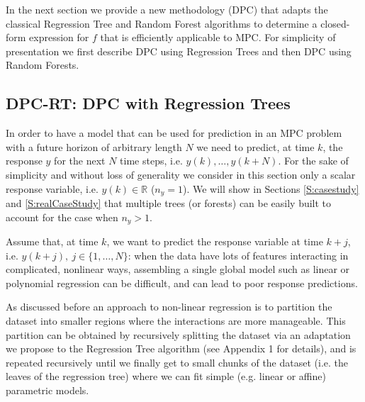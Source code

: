 \textcolor[rgb]{0,0,1}{In the next section we provide a new methodology (DPC) that adapts the classical Regression Tree and Random Forest algorithms to determine a closed-form expression for $f$ that is efficiently applicable to MPC. For simplicity of presentation we first describe DPC using Regression Trees and then DPC using Random Forests.}


\subsection{DPC-RT: DPC with Regression Trees}
\label{SS:dpcrt}

\textcolor[rgb]{0,0,1}{In order to have a model that can be used for prediction in an MPC problem with a future horizon of arbitrary length $N$	 we need to predict, at time $k$, the response $y$ for the next $N$ time steps, i.e. $y(k),\ldots,y(k+N)$. For the sake of simplicity and without loss of generality we consider in this section only a scalar response variable, i.e. $y(k)\in\mathbb{R}$ ($n_y = 1$). We will show in Sections \ref{S:casestudy} and \ref{S:realCaseStudy} that multiple trees (or forests) can be easily built to account for the case when $n_y > 1$.}

\textcolor[rgb]{0,0,1}{Assume that, at time $k$, we want to predict the response variable at time $k+j$, i.e. $y(k+j),\ j\in \{1,\ldots,N\}$: when the data have lots of features interacting in complicated, nonlinear ways, assembling a single global model such as linear or polynomial regression can be difficult, and can lead to poor response predictions.}

\textcolor[rgb]{0,0,1}{As discussed before an approach to non-linear regression is to partition the dataset into smaller regions where the interactions are more manageable. This partition can be obtained by recursively splitting the dataset via an adaptation we propose to the Regression Tree algorithm (see Appendix 1 for details), and is repeated recursively until we finally get to small chunks of the dataset (i.e. the leaves of the regression tree) where we can fit simple (e.g. linear or affine) parametric models.}


